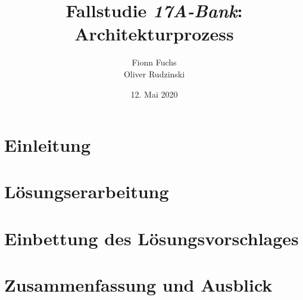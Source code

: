 


\title{Fallstudie \textit{17A-Bank}: Architekturprozess} 
\author{Fionn Fuchs\\Oliver Rudzinski}
\date{12. Mai 2020}



\makeatletter
{}


	\clearpage
	
	\thispagestyle{empty}
	
	
	\tableofcontents
	
	
	\chapter{Einleitung}
		\label{chap:einleitung}
		
	
	\chapter{Lösungserarbeitung}
		
		
	\chapter{Einbettung des Lösungsvorschlages}
		
		
	\chapter{Zusammenfassung und Ausblick}
		
	

	\clearpage
	\pagestyle{plain}
	\printbibliography
	
	\appendix
		\pagestyle{plain}
		

	
	
